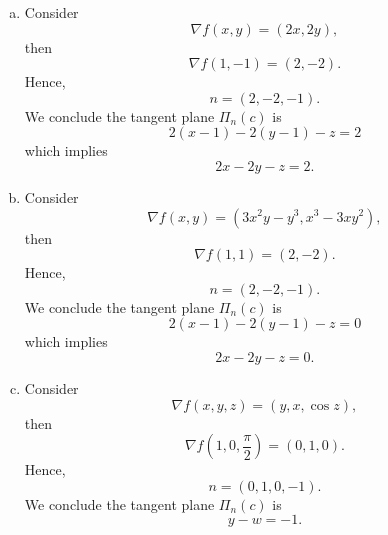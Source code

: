 \begin{Exercise}
\begin{enumerate}[a)]
\item
\begin{solution}
Consider
$$
\nabla f(x,y) = (2x,2y),
$$
then
$$
\nabla f(1,-1) = (2,-2).
$$
Hence,
$$
n = (2,-2,-1).
$$
We conclude the tangent plane $\Pi_n(c)$ is
$$
2(x-1)-2(y-1)-z = 2
$$
which implies
$$
2x-2y-z=2.
$$
\end{solution}

\item
\begin{solution}
Consider
$$
\nabla f(x,y) = (3x^2 y-y^3,x^3-3x y^2),
$$
then
$$
\nabla f(1,1) = (2,-2).
$$
Hence,
$$
n = (2,-2,-1).
$$
We conclude the tangent plane $\Pi_n(c)$ is
$$
2(x-1)-2(y-1)-z = 0
$$
which implies
$$
2x-2y-z=0.
$$
\end{solution}

\item
\begin{solution}
Consider
$$
\nabla f(x,y,z) = (y,x,\cos z),
$$
then
$$
\nabla f(1,0,\frac{\pi}{2}) = (0,1,0).
$$
Hence,
$$
n = (0,1,0,-1).
$$
We conclude the tangent plane $\Pi_n(c)$ is
$$
y-w=-1.
$$
\end{solution}
\end{enumerate}
\end{Exercise}